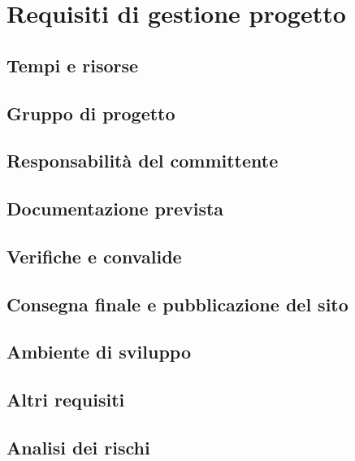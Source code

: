 \documentclass[a4paper,12pt,hidelinks]{report}
\begin{document}

\chapter{Requisiti di gestione progetto}

\section{Tempi e risorse}
\section{Gruppo di progetto}
\section{Responsabilità del committente}
\section{Documentazione prevista}
\section{Verifiche e convalide}
\section{Consegna finale e pubblicazione del sito}
\section{Ambiente di sviluppo}
\section{Altri requisiti}
\section{Analisi dei rischi}
\end{document}
